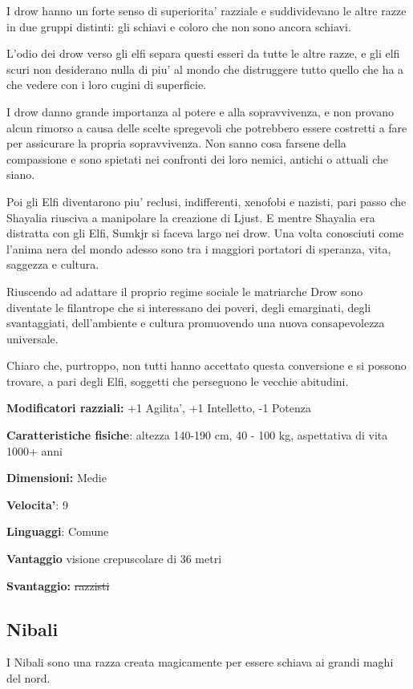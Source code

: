 \documentclass[a4paper,11pt,twoside,openany]{book}
\begin{document}
I drow hanno un forte senso di superiorita' razziale e suddividevano le altre razze in due gruppi distinti: gli schiavi e coloro che non sono ancora schiavi.

L'odio dei drow verso gli elfi separa questi esseri da tutte le altre razze, e gli elfi scuri non desiderano nulla di piu' al mondo che distruggere tutto quello che ha a che vedere con i loro cugini di superficie.

I drow danno grande importanza al potere e alla sopravvivenza, e non provano alcun rimorso a causa delle scelte spregevoli che potrebbero essere costretti a fare per assicurare la propria sopravvivenza. Non sanno cosa farsene della compassione e sono spietati nei confronti dei loro nemici, antichi o attuali che siano.

Poi gli Elfi diventarono piu' reclusi, indifferenti, xenofobi e nazisti, pari passo che Shayalia riusciva a manipolare la creazione di Ljust. E mentre Shayalia era distratta con gli Elfi, Sumkjr si faceva largo nei drow. Una volta conosciuti come l'anima nera del mondo adesso sono tra i maggiori portatori di speranza, vita, saggezza e cultura.

Riuscendo ad adattare il proprio regime sociale le matriarche Drow sono diventate le filantrope che si interessano dei poveri, degli emarginati, degli svantaggiati, dell'ambiente e cultura promuovendo una nuova consapevolezza universale.

Chiaro che, purtroppo, non tutti hanno accettato questa conversione e si possono trovare, a pari degli Elfi, soggetti che perseguono le vecchie abitudini.

\textbf{Modificatori razziali:} +1 Agilita', +1 Intelletto, -1 Potenza

\textbf{Caratteristiche fisiche}: altezza 140-190 cm, 40 - 100 kg,
aspettativa di vita 1000+ anni

\textbf{Dimensioni:} Medie

\textbf{Velocita'}: 9

\textbf{Linguaggi}: Comune

\textbf{Vantaggio} visione crepuscolare di 36 metri

\textbf{Svantaggio:} \sout{razzisti}

\subsection{Nibali}

\label{nibali}

I Nibali sono una razza creata magicamente per essere schiava ai grandi maghi del nord.
\end{document}

